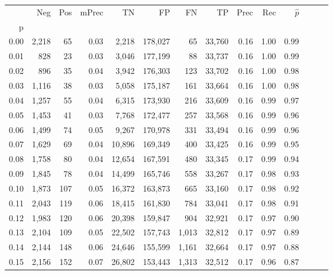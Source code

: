 \begin{tabular}{rrrrrrrrrrrrrr}
\toprule
{} &    Neg &  Pos & mPrec &       TN &       FP &      FN &      TP &  Prec &   Rec & $\hat{p}$ \\
p    &        &      &       &          &          &         &         &       &       &           \\
\midrule
0.00 &  2,218 &   65 &  0.03 &    2,218 &  178,027 &      65 &  33,760 &  0.16 &  1.00 &      0.99 \\
0.01 &    828 &   23 &  0.03 &    3,046 &  177,199 &      88 &  33,737 &  0.16 &  1.00 &      0.99 \\
0.02 &    896 &   35 &  0.04 &    3,942 &  176,303 &     123 &  33,702 &  0.16 &  1.00 &      0.98 \\
0.03 &  1,116 &   38 &  0.03 &    5,058 &  175,187 &     161 &  33,664 &  0.16 &  1.00 &      0.98 \\
0.04 &  1,257 &   55 &  0.04 &    6,315 &  173,930 &     216 &  33,609 &  0.16 &  0.99 &      0.97 \\
0.05 &  1,453 &   41 &  0.03 &    7,768 &  172,477 &     257 &  33,568 &  0.16 &  0.99 &      0.96 \\
0.06 &  1,499 &   74 &  0.05 &    9,267 &  170,978 &     331 &  33,494 &  0.16 &  0.99 &      0.96 \\
0.07 &  1,629 &   69 &  0.04 &   10,896 &  169,349 &     400 &  33,425 &  0.16 &  0.99 &      0.95 \\
0.08 &  1,758 &   80 &  0.04 &   12,654 &  167,591 &     480 &  33,345 &  0.17 &  0.99 &      0.94 \\
0.09 &  1,845 &   78 &  0.04 &   14,499 &  165,746 &     558 &  33,267 &  0.17 &  0.98 &      0.93 \\
0.10 &  1,873 &  107 &  0.05 &   16,372 &  163,873 &     665 &  33,160 &  0.17 &  0.98 &      0.92 \\
0.11 &  2,043 &  119 &  0.06 &   18,415 &  161,830 &     784 &  33,041 &  0.17 &  0.98 &      0.91 \\
0.12 &  1,983 &  120 &  0.06 &   20,398 &  159,847 &     904 &  32,921 &  0.17 &  0.97 &      0.90 \\
0.13 &  2,104 &  109 &  0.05 &   22,502 &  157,743 &   1,013 &  32,812 &  0.17 &  0.97 &      0.89 \\
0.14 &  2,144 &  148 &  0.06 &   24,646 &  155,599 &   1,161 &  32,664 &  0.17 &  0.97 &      0.88 \\
0.15 &  2,156 &  152 &  0.07 &   26,802 &  153,443 &   1,313 &  32,512 &  0.17 &  0.96 &      0.87 \\

\end{tabular}
